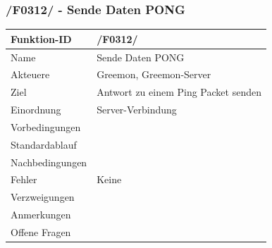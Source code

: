 \documentclass[pointlessnumbers]{scrartcl}
\begin{document}
 \subsubsection{/F0312/ - Sende Daten PONG}
 \begin{tabular}{|p{\BreiteErsterTab}|p{\BreiteZweiterTab}|}\hline
   Funktion-ID          & /F0312/  
                        \\ \hline
   Name                 & Sende Daten PONG
                        \\ \hline
   Akteuere             & Greemon, Greemon-Server
                        \\ \hline
   Ziel                 & Antwort zu einem Ping Packet senden 
                        \\ \hline
    Einordnung          &  Server-Verbindung 
                        \\ \hline
    Vorbedingungen      & 
                        \\ \hline
    Standardablauf      & 
                        \\ \hline
    Nachbedingungen     &  
                        \\ \hline
    Fehler              & Keine 
                        \\ \hline
    Verzweigungen       & 
                        \\ \hline
    Anmerkungen         &  
                        \\ \hline
    Offene Fragen       & 
                        \\ \hline
 \end{tabular} 
\end{document}
